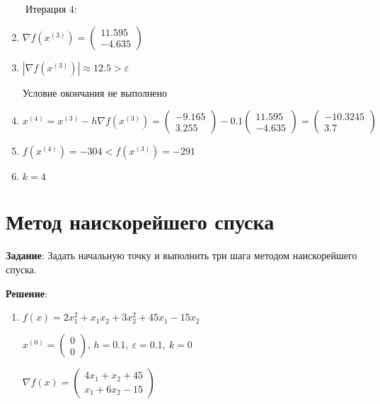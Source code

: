 \documentclass{article}
\begin{document}
\ \ \ \ Итерация 4:

\begin{enumerate}
    \setcounter{enumi}{1}
    \item $\nabla f(x^{(3)}) = \begin{pmatrix} 11.595 \\ -4.635 \end{pmatrix}$
    \item $|\nabla f(x^{(3)})| \approx 12.5 > \varepsilon$
    
        Условие окончания не выполнено
    \item $x^{(4)} = x^{(3)} - h\nabla f(x^{(3)}) =
        \begin{pmatrix} -9.165 \\ 3.255 \end{pmatrix} - 0.1
        \begin{pmatrix} 11.595 \\ -4.635 \end{pmatrix} =
        \begin{pmatrix} -10.3245 \\ 3.7 \end{pmatrix}$
    \item $f(x^{(4)}) = -304 < f(x^{(3)}) = -291$
    \item $k = 4$
\end{enumerate}

\pagebreak

\section{Метод наискорейшего спуска}

\textbf{Задание}: Задать начальную точку и выполнить три шага методом наискорейшего спуска. 

\textbf{Решение}:

\begin{enumerate}
    \item
        $f(x) = 2x_1^2 + x_1x_2 + 3x_2^2 + 45x_1 - 15x_2$
        
        $x^{(0)} = \begin{pmatrix} 0 \\ 0 \end{pmatrix}$, 
        $h = 0.1, \ \varepsilon = 0.1, \ k= 0$
        
        $\nabla f(x) =
        \begin{pmatrix}
            4x_1 + x_2 + 45 \\
            x_1 + 6x_2 - 15
        \end{pmatrix}$
\end{enumerate}
\end{document}

